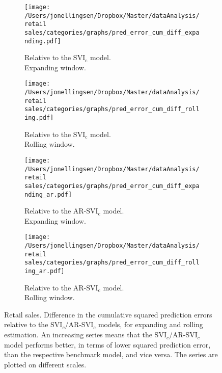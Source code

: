 \begin{figure}[H]
    \centering
    \begin{subfigure}[b]{0.45\textwidth}
\caption{Relative to the $\text{SVI}_\text{c}$ model.\\Expanding window.}
\label{error_diff_rsales_categories_plain_expanding}
        \texttt{[image: /Users/jonellingsen/Dropbox/Master/dataAnalysis/retail sales/categories/graphs/pred\_error\_cum\_diff\_expanding.pdf]}
    \end{subfigure}\hfill
    \begin{subfigure}[b]{0.45\textwidth}
\caption{Relative to the $\text{SVI}_\text{c}$ model.\\Rolling window.}
\label{error_diff_rsales_categories_plain_rolling}
        \texttt{[image: /Users/jonellingsen/Dropbox/Master/dataAnalysis/retail sales/categories/graphs/pred\_error\_cum\_diff\_rolling.pdf]}
    \end{subfigure}
\begin{subfigure}[b]{0.45\textwidth}
 \caption{Relative to the AR-$\text{SVI}_\text{c}$ model.\\Expanding window.}
\label{error_diff_rsales_categories_ar_expanding}       
\texttt{[image: /Users/jonellingsen/Dropbox/Master/dataAnalysis/retail sales/categories/graphs/pred\_error\_cum\_diff\_expanding\_ar.pdf]}
    \end{subfigure}\hfill
\begin{subfigure}[b]{0.45\textwidth}
\caption{Relative to the AR-$\text{SVI}_\text{c}$ model.\\Rolling window.} 
\label{error_diff_rsales_categories_ar_rolling}       
\texttt{[image: /Users/jonellingsen/Dropbox/Master/dataAnalysis/retail sales/categories/graphs/pred\_error\_cum\_diff\_rolling\_ar.pdf]}
    \end{subfigure}
\caption{Retail sales. Difference in the cumulative squared prediction errors relative to the SVI$_c$/AR-SVI$_c$ models, for expanding and rolling estimation. An increasing series means that the SVI$_c$/AR-SVI$_c$ model performs better, in terms of lower squared prediction error, than the respective benchmark model, and vice versa. The series are plotted on different scales.}
\label{error_diff_rsales_categories}
\end{figure}
